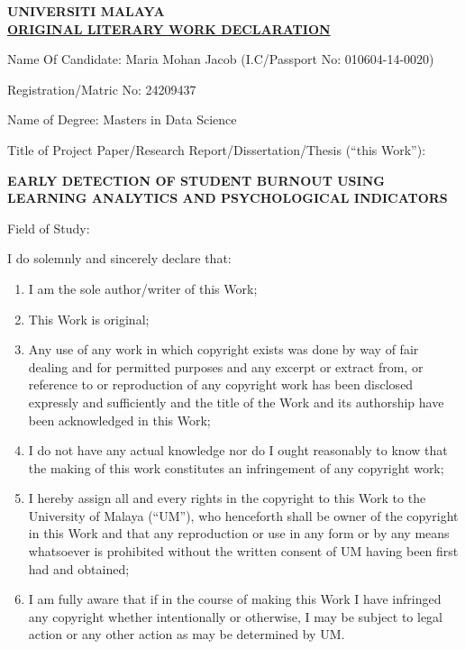 \begin{center}
  {\bf \Large \textsf{UNIVERSITI MALAYA}}\\

    \vspace{2mm}
    \underline{\textbf{\textsf{\Large ORIGINAL LITERARY WORK DECLARATION}}}
\end{center}
\vspace{-3mm}
\textsf{Name Of Candidate: Maria Mohan Jacob \hspace{3cm} (I.C/Passport No: 010604-14-0020)}
    
\textsf{Registration/Matric No: 24209437}
    
\textsf{Name of Degree: Masters in Data Science}

{\sffamily Title of Project Paper/Research Report/Dissertation/Thesis (“this Work”): 

\centering
\textbf{EARLY DETECTION OF STUDENT BURNOUT USING LEARNING ANALYTICS AND PSYCHOLOGICAL INDICATORS}
\par
}

\textsf{Field of Study:}

\textsf{\hspace*{15pt}I do solemnly and sincerely declare that:\vspace{-10pt}}
{\sffamily
\begin{enumerate}[label=(\arabic*), itemsep=0pt, parsep=0pt, topsep=0pt]
    \item I am the sole author/writer of this Work;
    \item This Work is original; 
    \item Any use of any work in which copyright exists was done by way of fair dealing and for permitted purposes and any excerpt or extract from, or reference to or reproduction of any copyright work has been disclosed expressly and sufficiently and the title of the Work and its authorship have been acknowledged in this Work; 
    \item I do not have any actual knowledge nor do I ought reasonably to know that the making of this work constitutes an infringement of any copyright work; 
    \item I hereby assign all and every rights in the copyright to this Work to the University of Malaya (“UM”), who henceforth shall be owner of the copyright in this Work and that any reproduction or use in any form or by any means whatsoever is prohibited without the written consent of UM having been first had and obtained; 
    \item I am fully aware that if in the course of making this Work I have infringed any copyright whether intentionally or otherwise, I may be subject to legal action or any other action as may be determined by UM. 
\end{enumerate}
}
\vspace{50pt}


\vspace{20pt}

